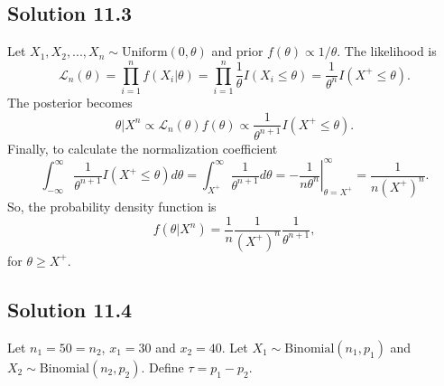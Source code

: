 \subsection*{Solution 11.3}

Let $X_1, X_2, ..., X_n \sim \mathrm{Uniform}(0, \theta)$ and prior $f(\theta) \propto 1/\theta$.
The likelihood is
\begin{equation*}
    \mathcal{L}_n(\theta)
        = \prod_{i = 1}^n f(X_i | \theta)
        = \prod_{i = 1}^n \frac{1}{\theta} I(X_i \leq \theta)
        = \frac{1}{\theta^n} I(X^+ \leq \theta).
\end{equation*}
The posterior becomes
\begin{equation*}
    \theta | X^n \propto \mathcal{L}_n(\theta) f(\theta)
        \propto \frac{1}{\theta^{n+1}} I(X^+ \leq \theta).
\end{equation*}
Finally, to calculate the normalization coefficient
\begin{equation*}
    \int_{-\infty}^{\infty} \frac{1}{\theta^{n+1}} I(X^+ \leq \theta) d\theta
        = \int_{X^+}^{\infty} \frac{1}{\theta^{n+1}} d\theta
        = \left.-\frac{1}{n\theta^n}\right|_{\theta = X^+}^{\infty}
        = \frac{1}{n (X^+)^n}.
\end{equation*}
So, the probability density function is
\begin{equation*}
    f(\theta|X^n) = \frac{1}{n} \frac{1}{(X^+)^n} \frac{1}{\theta^{n+1}},
\end{equation*}
for $\theta \geq X^+$.


\subsection*{Solution 11.4}

Let $n_1 = 50 = n_2$, $x_1 = 30$ and $x_2 = 40$.
Let $X_1 \sim \mathrm{Binomial}(n_1, p_1)$ and $X_2 \sim \mathrm{Binomial}(n_2, p_2)$.
Define $\tau = p_1 - p_2$.

